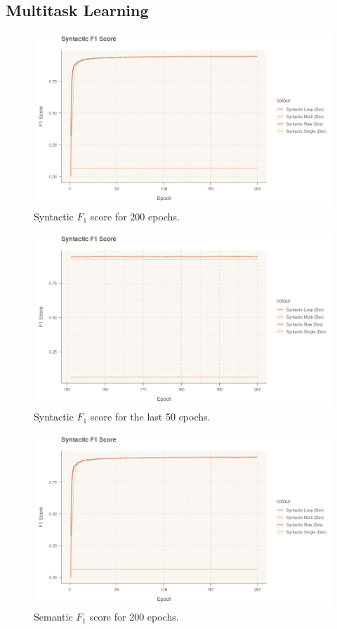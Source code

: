 \documentclass[11pt]{scrartcl}
\begin{document}
\subsection{Multitask Learning}

\begin{figure}[hbt]
	\center
	\includegraphics[width=1.0\textwidth]{img/syntactic_f1_200.png}
	\caption{Syntactic $F_1$ score for 200 epochs.}
	\label{fig:syntactic_f1_200}
\end{figure}

\begin{figure}[hbt]
	\center
	\includegraphics[width=1.0\textwidth]{img/syntactic_f1_50.png}
	\caption{Syntactic $F_1$ score for the last 50 epochs.}
	\label{fig:syntactic_f1_50}
\end{figure}

\begin{figure}[hbt]
	\center
	\includegraphics[width=1.0\textwidth]{img/semantic_f1_200.png}
	\caption{Semantic $F_1$ score for 200 epochs.}
	\label{fig:semantic_f1_200}
\end{figure}
\end{document}

